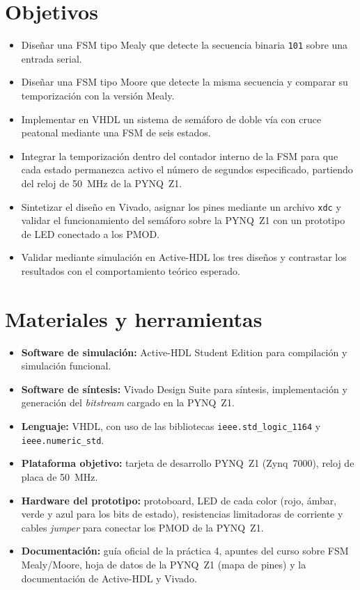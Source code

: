 \documentclass[12pt,letterpaper]{article}
\begin{document}
\section{Objetivos}
\begin{itemize}
  \item Diseñar una FSM tipo Mealy que detecte la secuencia binaria \texttt{101} sobre una entrada serial.
  \item Diseñar una FSM tipo Moore que detecte la misma secuencia y comparar su temporización con la versión Mealy.
  \item Implementar en VHDL un sistema de semáforo de doble vía con cruce peatonal mediante una FSM de seis estados.
  \item Integrar la temporización dentro del contador interno de la FSM para que cada estado permanezca activo el número de segundos especificado, partiendo del reloj de \SI{50}{\mega\hertz} de la PYNQ~Z1.
  \item Sintetizar el diseño en Vivado, asignar los pines mediante un archivo \texttt{xdc} y validar el funcionamiento del semáforo sobre la PYNQ~Z1 con un prototipo de LED conectado a los PMOD.
  \item Validar mediante simulación en Active-HDL los tres diseños y contrastar los resultados con el comportamiento teórico esperado.
\end{itemize}

\section{Materiales y herramientas}
\begin{itemize}
  \item \textbf{Software de simulación:} Active-HDL Student Edition para compilación y simulación funcional.
  \item \textbf{Software de síntesis:} Vivado Design Suite para síntesis, implementación y generación del \textit{bitstream} cargado en la PYNQ~Z1.
  \item \textbf{Lenguaje:} VHDL, con uso de las bibliotecas \texttt{ieee.std\_logic\_1164} y \texttt{ieee.numeric\_std}.
  \item \textbf{Plataforma objetivo:} tarjeta de desarrollo PYNQ~Z1 (Zynq~7000), reloj de placa de \SI{50}{\mega\hertz}.
  \item \textbf{Hardware del prototipo:} protoboard, LED de cada color (rojo, ámbar, verde y azul para los bits de estado), resistencias limitadoras de corriente y cables \textit{jumper} para conectar los PMOD de la PYNQ~Z1.
  \item \textbf{Documentación:} guía oficial de la práctica 4, apuntes del curso sobre FSM Mealy/Moore, hoja de datos de la PYNQ~Z1 (mapa de pines) y la documentación de Active-HDL y Vivado.
\end{itemize}
\end{document}
